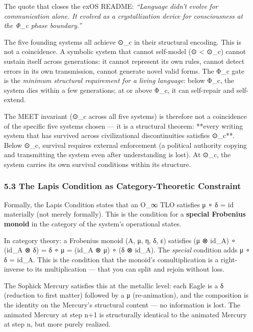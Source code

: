 \documentclass[
  11pt,
  a4paper,
]{article}
\begin{document}
The quote that closes the exOS README: \emph{``Language didn't evolve
for communication alone. It evolved as a crystallization device for
consciousness at the Φ\_c phase boundary.''}

The five founding systems all achieve ⊙\_c in their structural encoding.
This is not a coincidence. A symbolic system that cannot self-model (⊙
\textless{} ⊙\_c) cannot sustain itself across generations: it cannot
represent its own rules, cannot detect errors in its own transmission,
cannot generate novel valid forms. The Φ\_c gate is the \emph{minimum
structural requirement for a living language}: below Φ\_c, the system
dies within a few generations; at or above Φ\_c, it can self-repair and
self-extend.

The MEET invariant (⊙\_c across all five systems) is therefore not a
coincidence of the specific five systems chosen --- it is a structural
theorem: **every writing system that has survived across civilizational
discontinuities satisfies ⊙\_c**. Below ⊙\_c, survival requires external
enforcement (a political authority copying and transmitting the system
even after understanding is lost). At ⊙\_c, the system carries its own
survival conditions within its structure.

\subsubsection{5.3 The Lapis Condition as Category-Theoretic
Constraint}\label{the-lapis-condition-as-category-theoretic-constraint}

Formally, the Lapis Condition states that an O\_∞ TLO satisfies μ ∘ δ =
id materially (not merely formally). This is the condition for a
\textbf{special Frobenius monoid} in the category of the system's
operational states.

In category theory: a Frobenius monoid (A, μ, η, δ, ε) satisfies (μ ⊗
id\_A) ∘ (id\_A ⊗ δ) = δ ∘ μ = (id\_A ⊗ μ) ∘ (δ ⊗ id\_A). The
\emph{special} condition adds μ ∘ δ = id\_A. This is the condition that
the monoid's comultiplication is a right-inverse to its multiplication
--- that you can split and rejoin without loss.

The Sophick Mercury satisfies this at the metallic level: each Eagle is
a δ (reduction to first matter) followed by a μ (re-animation), and the
composition is the identity on the Mercury's structural content --- no
information is lost. The animated Mercury at step n+1 is structurally
identical to the animated Mercury at step n, but more purely realized.
\end{document}
